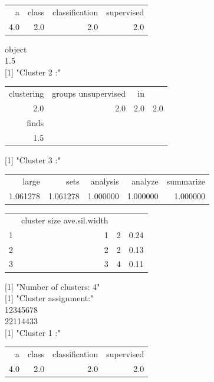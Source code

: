 \documentclass[10pt]{book}
\begin{document}
\begin{center}
\begin{tabular}{rrrr}
a & class & classification & supervised \\
4.0 & 2.0 & 2.0 & 2.0 \\
\end{tabular}
\end{center}

object\\
1.5\\[0pt]
[1] "Cluster 2 :"

\begin{center}
\begin{tabular}{rrrr}
clustering & groups unsupervised & in &  \\
2.0 & 2.0 & 2.0 & 2.0 \\
finds &  &  &  \\
1.5 &  &  &  \\
\end{tabular}
\end{center}

[1] "Cluster 3 :"

\begin{center}
\begin{tabular}{rrrrr}
large & sets & analysis & analyze & summarize \\
1.061278 & 1.061278 & 1.000000 & 1.000000 & 1.000000 \\
\end{tabular}
\end{center}

\begin{center}
\begin{tabular}{rrrr}
 & cluster size ave.sil.width &  &  \\
1 & 1 & 2 & 0.24 \\
2 & 2 & 2 & 0.13 \\
3 & 3 & 4 & 0.11 \\
\end{tabular}
\end{center}

[1] "Number of clusters: 4"\\[0pt]
[1] "Cluster assignment:"\\
12345678\\
22114433\\[0pt]
[1] "Cluster 1 :"

\begin{center}
\begin{tabular}{rrrr}
a & class & classification & supervised \\
4.0 & 2.0 & 2.0 & 2.0 \\
\end{tabular}
\end{center}
\end{document}
